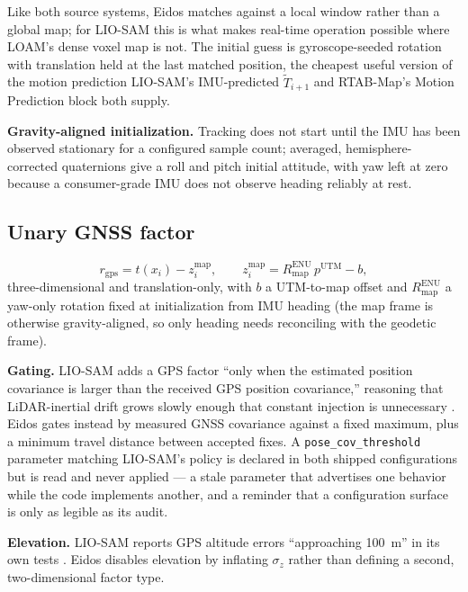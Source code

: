 \documentclass[conference]{IEEEtran}
\begin{document}
Like both source systems, Eidos matches against a local window rather than a global map; for LIO-SAM this is what makes real-time operation possible where LOAM's dense voxel map is not. The initial guess is gyroscope-seeded rotation with translation held at the last matched position, the cheapest useful version of the motion prediction LIO-SAM's IMU-predicted $\tilde{T}_{i+1}$ and RTAB-Map's Motion Prediction block both supply.

\textbf{Gravity-aligned initialization.} Tracking does not start until the IMU has been observed stationary for a configured sample count; averaged, hemisphere-corrected quaternions give a roll and pitch initial attitude, with yaw left at zero because a consumer-grade IMU does not observe heading reliably at rest.

\subsection{Unary GNSS factor}
\begin{equation}
r_{\text{gps}} = t(x_i) - z_i^{\text{map}}, \qquad z_i^{\text{map}} = R_{\text{map}}^{\text{ENU}}\,p^{\text{UTM}} - b,
\end{equation}
three-dimensional and translation-only, with $b$ a UTM-to-map offset and $R_{\text{map}}^{\text{ENU}}$ a yaw-only rotation fixed at initialization from IMU heading (the map frame is otherwise gravity-aligned, so only heading needs reconciling with the geodetic frame).

\textbf{Gating.} LIO-SAM adds a GPS factor ``only when the estimated position covariance is larger than the received GPS position covariance,'' reasoning that LiDAR-inertial drift grows slowly enough that constant injection is unnecessary \parencite{shan2020liosam}. Eidos gates instead by measured GNSS covariance against a fixed maximum, plus a minimum travel distance between accepted fixes. A \texttt{pose\_cov\_threshold} parameter matching LIO-SAM's policy is declared in both shipped configurations but is read and never applied --- a stale parameter that advertises one behavior while the code implements another, and a reminder that a configuration surface is only as legible as its audit.

\textbf{Elevation.} LIO-SAM reports GPS altitude errors ``approaching 100~m'' in its own tests \parencite{shan2020liosam}. Eidos disables elevation by inflating $\sigma_z$ rather than defining a second, two-dimensional factor type.
\end{document}
